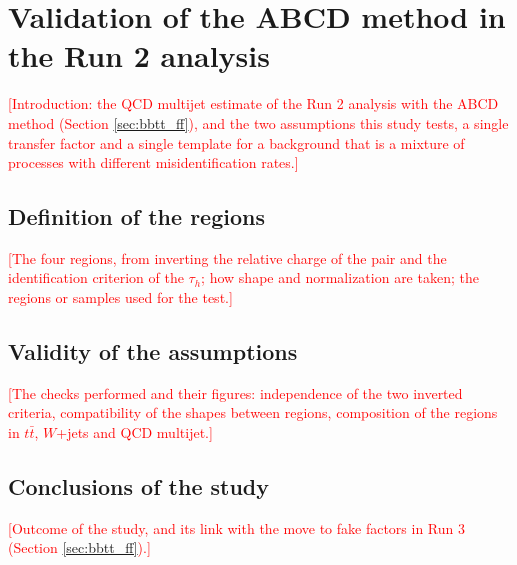 \chapter{Validation of the ABCD method in the Run 2 analysis}
\label{app:abcd_validation}
%
\textcolor{red}{[Introduction: the QCD multijet estimate of the Run 2 analysis with the ABCD method (Section \ref{sec:bbtt_ff}), and the two assumptions this study tests, a single transfer factor and a single template for a background that is a mixture of processes with different misidentification rates.]}

\section{Definition of the regions}
\label{app:abcd_regions}
%
\textcolor{red}{[The four regions, from inverting the relative charge of the pair and the identification criterion of the $\tau_h$; how shape and normalization are taken; the regions or samples used for the test.]}

\section{Validity of the assumptions}
\label{app:abcd_tests}
%
\textcolor{red}{[The checks performed and their figures: independence of the two inverted criteria, compatibility of the shapes between regions, composition of the regions in $t\bar{t}$, $W$+jets and QCD multijet.]}

\section{Conclusions of the study}
\label{app:abcd_conclusions}
%
\textcolor{red}{[Outcome of the study, and its link with the move to fake factors in Run 3 (Section \ref{sec:bbtt_ff}).]}

